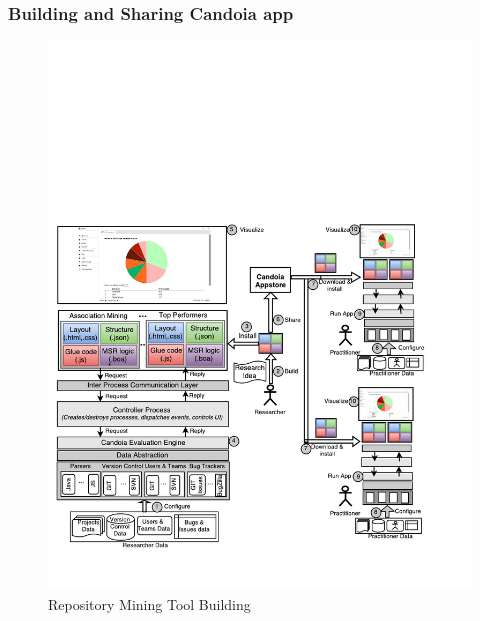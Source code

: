         \begin{frame}
            \frametitle{Building and Sharing Candoia app}
            \begin{figure}
                \centering
                \includegraphics[width=0.55\linewidth]{figures/overview.pdf}
                \caption{Repository Mining Tool Building}
            \end{figure}
        \end{frame}


